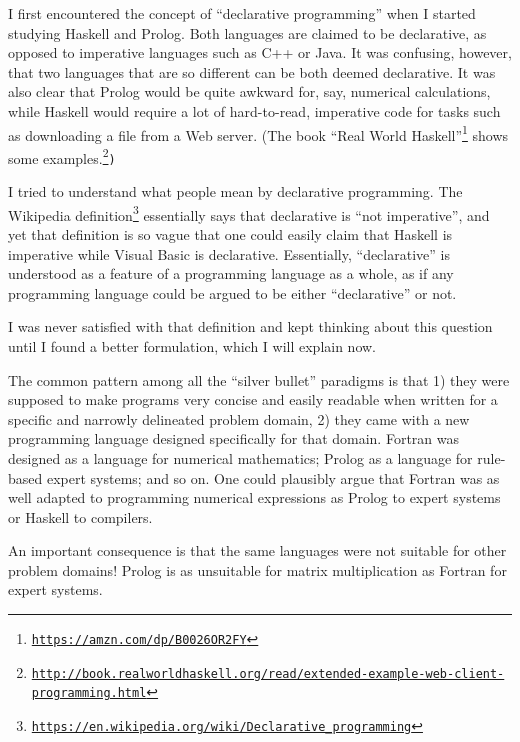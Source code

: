 I first encountered the concept of \textsf{``}declarative programming\textsf{''} when
I started studying Haskell and Prolog. Both languages are claimed
to be declarative, as opposed to imperative languages such as C++
or Java. It was confusing, however, that two languages that are so
different can be both deemed declarative. It was also clear that Prolog
would be quite awkward for, say, numerical calculations, while Haskell
would require a lot of hard-to-read, imperative code for tasks such
as downloading a file from a Web server. (The book \textsf{``}Real World Haskell\textsf{''}\footnote{\texttt{\href{https://amzn.com/dp/B0026OR2FY}{https://amzn.com/dp/B0026OR2FY}}}
shows some examples.\texttt{}\footnote{\texttt{\href{http://book.realworldhaskell.org/read/extended-example-web-client-programming.html}{http://book.realworldhaskell.org/read/extended-example-web-client-programming.html}}}\texttt{)}

I tried to understand what people mean by declarative programming.
The Wikipedia definition\footnote{\texttt{\href{https://en.wikipedia.org/wiki/Declarative_programming}{https://en.wikipedia.org/wiki/Declarative\_programming}}}
essentially says that declarative is \textsf{``}not imperative\textsf{''}, and yet
that definition is so vague that one could easily claim that Haskell
is imperative while Visual Basic is declarative. Essentially, \textsf{``}declarative\textsf{''}
is understood as a feature of a programming language as a whole, as
if any programming language could be argued to be either \textsf{``}declarative\textsf{''}
or not.

I was never satisfied with that definition and kept thinking about
this question until I found a better formulation, which I will explain
now.

The common pattern among all the \textsf{``}silver bullet\textsf{''} paradigms is
that 1) they were supposed to make programs very concise and easily
readable when written for a specific and narrowly delineated problem
domain, 2) they came with a new programming language designed specifically
for that domain. Fortran was designed as a language for numerical
mathematics; Prolog as a language for rule-based expert systems; and
so on. One could plausibly argue that Fortran was as well adapted
to programming numerical expressions as Prolog to expert systems or
Haskell to compilers.

An important consequence is that the same languages were not suitable
for other problem domains! Prolog is as unsuitable for matrix multiplication
as Fortran for expert systems.

